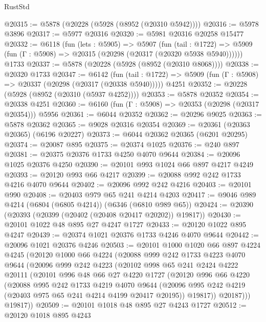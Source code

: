 \begin{lexlean}{RustStd}
\begin{coremodule}
@20315 := @5878 (@20228 (@5928 (@8952 (@20310 @5942))))
@20316 := @5978 @3896
@20317 := @5977 @20316
@20320 := @5981 @20316 @20258 @15477
@20332 := @6118
    (fun (lets : @5905) =>
    @5907
      (fun (tail : @1722) =>
      @5909 (fun (Γ : @5908) => @20315 (@20298 (@20317 (@20320 @5938 @5940))))))
    @1733
@20337 := @5878 (@20228 (@5928 (@8952 (@20310 @8068))))
@20338 := @20320 @1733
@20347 := @6142
    (fun (tail : @1722) => @5909 (fun (Γ : @5908) => @20337 (@20298 (@20317 (@20338 @5940)))))
    @4251
@20352 := @20228 (@5928 (@8952 (@20310 (@5937 @4252))))
@20353 := @5878 @20352
@20354 := @20338 @4251
@20360 := @6160 (fun (Γ : @5908) => @20353 (@20298 (@20317 @20354))) @5956
@20361 := @6044 @20352
@20362 := @20296 @9025
@20363 := @5878 @20362
@20365 := @9028 @20316 @20354
@20369 := @20361 (@20363 @20365) (@6196 @20227)
@20373 := @6044 @20362 @20365 (@6201 @20295)
@20374 := @20087 @895
@20375 := @20374 @1025
@20376 := @240 @897
@20381 := @20375 @20376 @1733 @4250 @4070 @9644
@20384 := @20096 @1025 @20376 @4250
@20390 := @20101 @993 @1024 @66 @897 @4217 @4249
@20393 := @20120 @993 @66 @4217
@20399 := @20088 @992 @242 @1733 @4216 @4070 @9644
@20402 := @20096 @992 @242 @4216
@20403 := @20101 @990
@20408 := @20403 @979 @65 @241 @4214 @4203
@20417 := @9046 @989 @4214 (@6804 (@6805 @4214)) (@6346 (@6810 @989 @65))
@20424 := @20390 (@20393 (@20399 (@20402 (@20408 @20417 @20202)) @19817))
@20430 := @20101 @1022 @48 @895 @27 @4247 @1727
@20433 := @20120 @1022 @895 @4247
@20439 := @20374 @1021 @20376 @1733 @4246 @4070 @9644
@20442 := @20096 @1021 @20376 @4246
@20503 := @20101
    @1000
    @1020
    @66
    @897
    @4224
    @4245
    (@20120
      @1000
      @66
      @4224
      (@20088
        @999
        @242
        @1733
        @4223
        @4070
        @9644
        (@20096
          @999
          @242
          @4223
          (@20102
            @998
            @65
            @241
            @2424
            @4222
            @20111
            (@20101
              @996
              @48
              @66
              @27
              @4220
              @1727
              (@20120
                @996
                @66
                @4220
                (@20088
                  @995
                  @242
                  @1733
                  @4219
                  @4070
                  @9644
                  (@20096 @995 @242 @4219 (@20403 @975 @65 @241 @4214 @4199 @20417 @20195))
                  @19817))
              @20187)))
        @19817))
@20509 := @20101 @1018 @48 @895 @27 @4243 @1727
@20512 := @20120 @1018 @895 @4243

\end{coremodule}
\end{lexlean}
